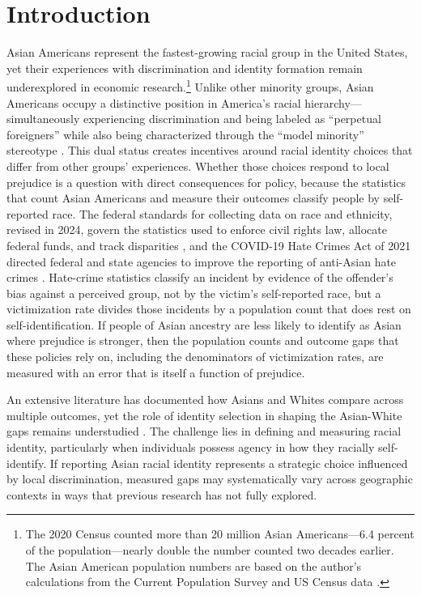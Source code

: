 
\section{Introduction}\label{sec:intro}

Asian Americans represent the fastest-growing racial group in the United States, yet their experiences with discrimination and identity formation remain underexplored in economic research.\footnote{The 2020 Census counted more than 20 million Asian Americans---6.4 percent of the population---nearly double the number counted two decades earlier. The Asian American population numbers are based on the author's calculations from the Current Population Survey and US Census data \autocite{floodsarahIntegratedPublicUse2021a}.} Unlike other minority groups, Asian Americans occupy a distinctive position in America's racial hierarchy---simultaneously experiencing discrimination and being labeled as ``perpetual foreigners'' while also being characterized through the ``model minority'' stereotype \autocite{foukaImmigrantsAmericansRace2022}. This dual status creates incentives around racial identity choices that differ from other groups' experiences. Whether those choices respond to local prejudice is a question with direct consequences for policy, because the statistics that count Asian Americans and measure their outcomes classify people by self-reported race. The federal standards for collecting data on race and ethnicity, revised in 2024, govern the statistics used to enforce civil rights law, allocate federal funds, and track disparities \autocite{ombRevisionsStatisticalPolicy2024}, and the COVID-19 Hate Crimes Act of 2021 directed federal and state agencies to improve the reporting of anti-Asian hate crimes \autocite{covid19HateCrimesAct2021}. Hate-crime statistics classify an incident by evidence of the offender's bias against a perceived group, not by the victim's self-reported race, but a victimization rate divides those incidents by a population count that does rest on self-identification. If people of Asian ancestry are less likely to identify as Asian where prejudice is stronger, then the population counts and outcome gaps that these policies rely on, including the denominators of victimization rates, are measured with an error that is itself a function of prejudice.

An extensive literature has documented how Asians and Whites compare across multiple outcomes, yet the role of identity selection in shaping the Asian-White gaps remains understudied \autocite{chiswick1983analysis, duleep2012economic, hilger2016upward, arabsheibani2010asian}. The challenge lies in defining and measuring racial identity, particularly when individuals possess agency in how they racially self-identify. If reporting Asian racial identity represents a strategic choice influenced by local discrimination, measured gaps may systematically vary across geographic contexts in ways that previous research has not fully explored.

